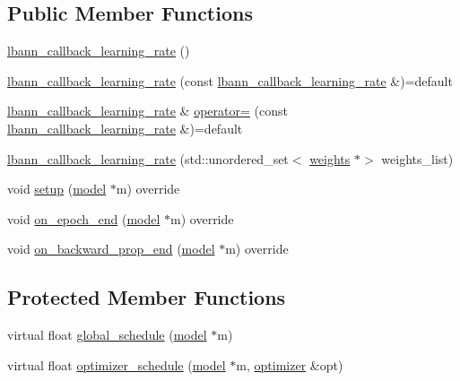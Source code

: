 \subsection*{Public Member Functions}
\begin{DoxyCompactItemize}
\item 
\hyperlink{classlbann_1_1lbann__callback__learning__rate_a69687cd55f4d09c480e08e18488519fe}{lbann\+\_\+callback\+\_\+learning\+\_\+rate} ()
\item 
\hyperlink{classlbann_1_1lbann__callback__learning__rate_af933186f239fdea911e8934fe58e97fa}{lbann\+\_\+callback\+\_\+learning\+\_\+rate} (const \hyperlink{classlbann_1_1lbann__callback__learning__rate}{lbann\+\_\+callback\+\_\+learning\+\_\+rate} \&)=default
\item 
\hyperlink{classlbann_1_1lbann__callback__learning__rate}{lbann\+\_\+callback\+\_\+learning\+\_\+rate} \& \hyperlink{classlbann_1_1lbann__callback__learning__rate_a80b82eebf8e38cbe0a484aea43644705}{operator=} (const \hyperlink{classlbann_1_1lbann__callback__learning__rate}{lbann\+\_\+callback\+\_\+learning\+\_\+rate} \&)=default
\item 
\hyperlink{classlbann_1_1lbann__callback__learning__rate_a0c544d120f949cfc5c2dcb07d69b3cde}{lbann\+\_\+callback\+\_\+learning\+\_\+rate} (std\+::unordered\+\_\+set$<$ \hyperlink{classlbann_1_1weights}{weights} $\ast$$>$ weights\+\_\+list)
\item 
void \hyperlink{classlbann_1_1lbann__callback__learning__rate_a501f31a6b8fde1282a60e4b347e8d9d3}{setup} (\hyperlink{classlbann_1_1model}{model} $\ast$m) override
\item 
void \hyperlink{classlbann_1_1lbann__callback__learning__rate_ab8eb509bdbea501882d6b248a814bb28}{on\+\_\+epoch\+\_\+end} (\hyperlink{classlbann_1_1model}{model} $\ast$m) override
\item 
void \hyperlink{classlbann_1_1lbann__callback__learning__rate_ab6aa0530604e32a1be2b37f3933f6bf6}{on\+\_\+backward\+\_\+prop\+\_\+end} (\hyperlink{classlbann_1_1model}{model} $\ast$m) override
\end{DoxyCompactItemize}
\subsection*{Protected Member Functions}
\begin{DoxyCompactItemize}
\item 
virtual float \hyperlink{classlbann_1_1lbann__callback__learning__rate_a7869b93e5963d6f76da68d8c8137b979}{global\+\_\+schedule} (\hyperlink{classlbann_1_1model}{model} $\ast$m)
\item 
virtual float \hyperlink{classlbann_1_1lbann__callback__learning__rate_acf7f3921a68e7f1f772106e18c545345}{optimizer\+\_\+schedule} (\hyperlink{classlbann_1_1model}{model} $\ast$m, \hyperlink{classlbann_1_1optimizer}{optimizer} \&opt)
\end{DoxyCompactItemize}
